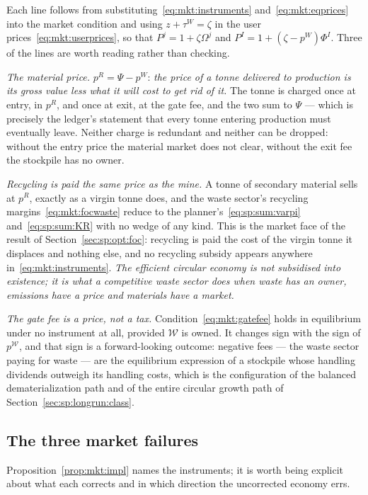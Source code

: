Each line follows from substituting~\eqref{eq:mkt:instruments} and~\eqref{eq:mkt:eqprices} into the market condition and using $z+\tau^W=\zeta$ in the user prices~\eqref{eq:mkt:userprices}, so that $P^j=1+\zeta\Omega^j$ and $P^I=1+\left(\zeta-p^W\right)\Phi^I$. Three of the lines are worth reading rather than checking.

\emph{The material price.} $p^R=\Psi-p^W$: \emph{the price of a tonne delivered to production is its gross value less what it will cost to get rid of it.} The tonne is charged once at entry, in $p^R$, and once at exit, at the gate fee, and the two sum to $\Psi$ --- which is precisely the ledger's statement that every tonne entering production must eventually leave. Neither charge is redundant and neither can be dropped: without the entry price the material market does not clear, without the exit fee the stockpile has no owner.

\emph{Recycling is paid the same price as the mine.} A tonne of secondary material sells at $p^R$, exactly as a virgin tonne does, and the waste sector's recycling margins~\eqref{eq:mkt:focwaste} reduce to the planner's~\eqref{eq:sp:sum:varpi} and~\eqref{eq:sp:sum:KR} with no wedge of any kind. This is the market face of the result of Section~\ref{sec:sp:opt:foc}: recycling is paid the cost of the virgin tonne it displaces and nothing else, and no recycling subsidy appears anywhere in~\eqref{eq:mkt:instruments}. \emph{The efficient circular economy is not subsidised into existence; it is what a competitive waste sector does when waste has an owner, emissions have a price and materials have a market.}

\emph{The gate fee is a price, not a tax.} Condition~\eqref{eq:mkt:gatefee} holds in equilibrium under no instrument at all, provided $\mathcal W$ is owned. It changes sign with the sign of $p^{\mathcal W}$, and that sign is a forward-looking outcome: negative fees --- the waste sector paying for waste --- are the equilibrium expression of a stockpile whose handling dividends outweigh its handling costs, which is the configuration of the balanced dematerialization path and of the entire circular growth path of Section~\ref{sec:sp:longrun:class}.

\subsection{The three market failures}\label{sec:mkt:impl:failures}

Proposition~\ref{prop:mkt:impl} names the instruments; it is worth being explicit about what each corrects and in which direction the uncorrected economy errs.

